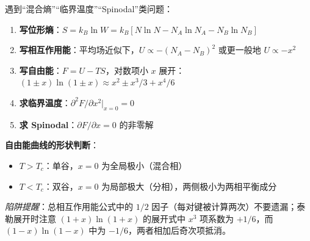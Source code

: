 \begin{thinkbox}
遇到``混合熵''``临界温度''``Spinodal''类问题：
\begin{enumerate}
    \item \textbf{写位形熵}：$S=k_{\!B}\ln W = k_{\!B}[N\ln N - N_A\ln N_A - N_B\ln N_B]$
    \item \textbf{写相互作用能}：平均场近似下，$U\propto -(N_A-N_B)^2$ 或更一般地 $U\propto -x^2$
    \item \textbf{写自由能}：$F=U-TS$，对数项小 $x$ 展开：$(1\pm x)\ln(1\pm x)\approx x^2\pm x^3/3+x^4/6$
    \item \textbf{求临界温度}：$\partial^2 F/\partial x^2|_{x=0}=0$
    \item \textbf{求 Spinodal}：$\partial F/\partial x=0$ 的非零解
\end{enumerate}

\textbf{自由能曲线的形状判断}：
\begin{itemize}
    \item $T>T_c$：单谷，$x=0$ 为全局极小（混合相）
    \item $T<T_c$：双谷，$x=0$ 为局部极大（分相），两侧极小为两相平衡成分
\end{itemize}
\textit{陷阱提醒}：总相互作用能公式中的 $1/2$ 因子（每对键被计算两次）不要遗漏；泰勒展开时注意 $(1+x)\ln(1+x)$ 的展开式中 $x^3$ 项系数为 $+1/6$，而 $(1-x)\ln(1-x)$ 中为 $-1/6$，两者相加后奇次项抵消。
\end{thinkbox}
